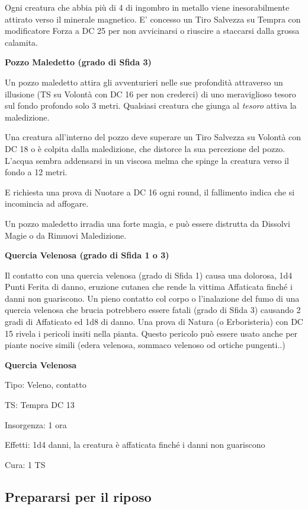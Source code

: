 \begin{multicols}{2}

Ogni creatura che abbia più di 4 di ingombro in metallo viene inesorabilmente attirato verso il minerale magnetico. E' concesso un Tiro Salvezza su Tempra con modificatore Forza a DC 25 per non avvicinarsi o riuscire a staccarsi dalla grossa calamita.

\medskip
\textbf{Pozzo Maledetto (grado di Sfida 3)}

Un pozzo maledetto attira gli avventurieri nelle sue profondità attraverso un illusione (TS su Volontà con DC 16 per non crederci) di uno meraviglioso tesoro sul fondo profondo solo 3 metri. Qualsiasi creatura che giunga al \emph{tesoro} attiva la maledizione.

Una creatura all'interno del pozzo deve superare un Tiro Salvezza su Volontà con DC 18 o è colpita dalla maledizione, che distorce la sua percezione del pozzo. L'acqua sembra addensarsi in un viscosa melma che spinge la creatura verso il fondo a 12 metri.

E richiesta una prova di Nuotare a DC 16 ogni round, il fallimento indica che si incomincia ad affogare.

Un pozzo maledetto irradia una forte magia, e può essere distrutta da Dissolvi Magie o da Rimuovi Maledizione.

\medskip
\textbf{Quercia Velenosa (grado di Sfida 1 o 3)}

Il contatto con una quercia velenosa (grado di Sfida 1) causa una dolorosa, 1d4 Punti Ferita di danno, eruzione cutanea che rende la vittima Affaticata finché i danni non guariscono. Un pieno contatto col corpo o l'inalazione del fumo di una quercia velenosa che brucia potrebbero essere fatali (grado di Sfida 3) causando 2 gradi di Affaticato ed 1d8 di danno.
Una prova di Natura (o Erboristeria) con DC 15 rivela i pericoli insiti nella pianta. Questo pericolo può essere usato anche per piante nocive simili (edera velenosa, sommaco velenoso od ortiche pungenti..)

\textbf{Quercia Velenosa}

Tipo: Veleno, contatto

TS: Tempra DC 13

Insorgenza: 1 ora

Effetti: 1d4 danni, la creatura è affaticata finché i danni non guariscono

Cura: 1 TS

\subsection{Prepararsi per il riposo}


\end{multicols}
